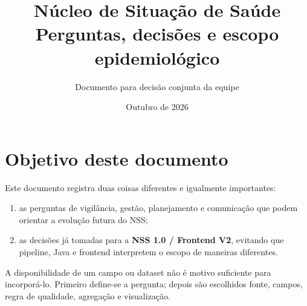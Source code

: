\documentclass[12pt,a4paper]{article}
\title{\textbf{Núcleo de Situação de Saúde}\\Perguntas, decisões e escopo epidemiológico}\author{Documento para decisão conjunta da equipe}\date{Outubro de 2026}
\begin{document}
\maketitle\tableofcontents\newpage
\section{Objetivo deste documento}
Este documento registra duas coisas diferentes e igualmente importantes:
\begin{enumerate}[leftmargin=*]\item as perguntas de vigilância, gestão, planejamento e comunicação que podem orientar a evolução futura do NSS;\item as decisões já tomadas para a \textbf{NSS 1.0 / Frontend V2}, evitando que pipeline, Java e frontend interpretem o escopo de maneiras diferentes.\end{enumerate}
A disponibilidade de um campo ou dataset não é motivo suficiente para incorporá-lo. Primeiro define-se a pergunta; depois são escolhidos fonte, campos, regra de qualidade, agregação e visualização.
\end{document}
